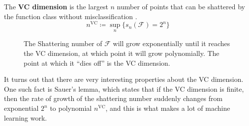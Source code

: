   \begin{definition}[VC Dimension]
    The \textbf{VC dimension} is the largest $n$ number of points that can be shattered by the function class without misclassification \cite{1971vapnik}. 
    \begin{equation}
      n^{\mathrm{VC}} \coloneqq \sup_n \{ s_n (\mathcal{F}) = 2^n \}
    \end{equation}

    \begin{figure}[H]
      \centering 
      \caption{The Shattering number of $\mathcal{F}$ will grow exponentially until it reaches the VC dimension, at which point it will grow polynomially. The point at which it ``dies off'' is the VC dimension.} 
      \label{fig:sawyer_lemma}
    \end{figure}
  \end{definition}

  It turns out that there are very interesting properties about the VC dimension. One such fact is Sauer's lemma, which states that if the VC dimension is finite, then the rate of growth of the shattering number suddenly changes from exponential $2^n$ to polynomial $n^{\mathrm{VC}}$, and this is what makes a lot of machine learning work. 

  \begin{lemma}
    
  \end{lemma}

